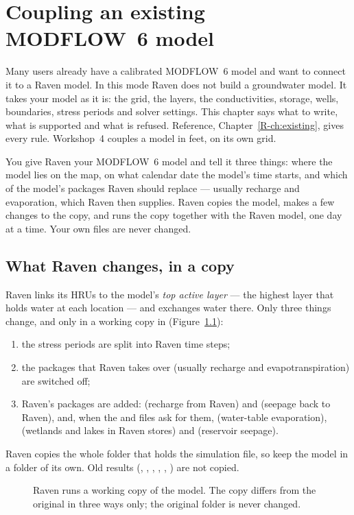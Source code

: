 \chapter{Coupling an existing MODFLOW~6 model}\label{uch:existing}
Many users already have a calibrated MODFLOW~6 model and want to connect it to a Raven model. In this mode Raven does
not build a groundwater model. It takes your model as it is: the grid, the layers, the conductivities, storage, wells,
boundaries, stress periods and solver settings. This chapter says what to write, what is supported and what is
refused. Reference, Chapter~\ref{R-ch:existing}, gives every rule. Workshop~4 couples a model in feet, on its own grid.

\begin{plain}
You give Raven your MODFLOW~6 model and tell it three things: where the model lies on the map, on what calendar date the
model's time starts, and which of the model's packages Raven should replace --- usually recharge and evaporation, which
Raven then supplies. Raven copies the model, makes a few changes to the copy, and runs the copy together with the Raven
model, one day at a time. Your own files are never changed.
\end{plain}

\section{What Raven changes, in a copy}
Raven links its HRUs to the model's \emph{top active layer} --- the highest layer that holds water at each location ---
and exchanges water there. Only three things change, and only in a working copy in 
(Figure~\ref{fig:uworkcopy}):
\begin{enumerate}
\item the stress periods are split into Raven time steps;
\item the packages that Raven takes over (usually recharge and evapotranspiration) are switched off;
\item Raven's packages are added:  (recharge from Raven) and  (seepage back to Raven),
and, when the  and  files ask for them,  (water-table evaporation), 
(wetlands and lakes in Raven stores) and  (reservoir seepage).
\end{enumerate}
Raven copies the whole folder that holds the simulation file, so keep the model in a folder of its own. Old results
(, , , , , ) are not copied.
\begin{figure}[!htbp]\centering
\caption{Raven runs a working copy of the model. The copy differs from the original in three ways only; the original folder is never changed.}\label{fig:uworkcopy}
\end{figure}


